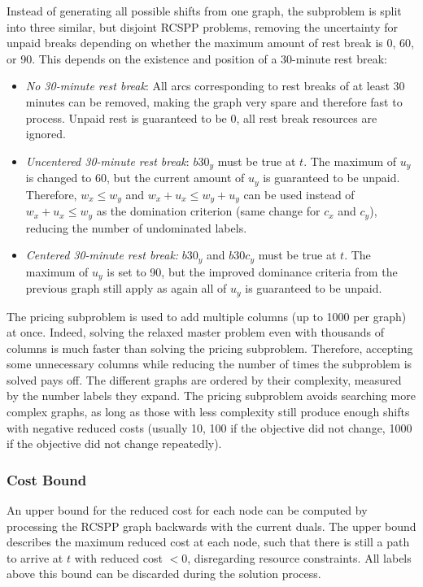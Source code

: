 \documentclass[]{amsart}
\theoremstyle{plain}
\begin{document}
Instead of generating all possible shifts from one graph, the subproblem is split into three similar, but disjoint RCSPP problems, removing the uncertainty for unpaid breaks depending on whether the maximum amount of rest break is 0, 60, or 90. This depends on the existence and position of a 30-minute rest break:
\begin{itemize}
\item {\em No 30-minute rest break}: All arcs corresponding to rest breaks of at least 30 minutes can be removed, making the graph very spare and therefore fast to process. Unpaid rest is guaranteed to be 0, all rest break resources are ignored.
\item {\em Uncentered 30-minute rest break}: $\mathit{b30}_y$ must be true at $t$. The maximum of $u_y$ is changed to 60, but the current amount of $u_y$ is guaranteed to be unpaid. Therefore, $w_x\leq w_y$ and $w_x+u_x\leq w_y+u_y$ can be used instead of $w_x+u_x\leq w_y$ as the domination criterion (same change for $c_x$ and $c_y$), reducing the number of undominated labels.
\item {\em Centered 30-minute rest break:} $\mathit{b30}_y$ and $\mathit{b30c}_y$ must be true at $t$. The maximum of $u_y$ is set to 90, but the improved dominance criteria from the previous graph still apply as again all of $u_y$ is guaranteed to be unpaid.
\end{itemize}

\noindent
The pricing subproblem is used to add multiple columns (up to 1000 per graph) at once. Indeed, solving the relaxed master problem even with thousands of columns is much faster than solving the pricing subproblem. Therefore, accepting some unnecessary columns while reducing the number of times the subproblem is solved pays off. The different graphs are ordered by their complexity, measured by the number labels they expand. The pricing subproblem avoids searching more complex graphs, as long as those with less complexity still produce enough shifts with negative reduced costs (usually 10, 100 if the objective did not change, 1000 if the objective did not change repeatedly).

\subsubsection{Cost Bound}

An upper bound for the reduced cost for each node can be computed by processing the RCSPP graph backwards with the current duals. The upper bound describes the maximum reduced cost at each node, such that there is still a path to arrive at $t$ with reduced cost $<0$, disregarding resource constraints. All labels above this bound can be discarded during the solution process.
\end{document}
